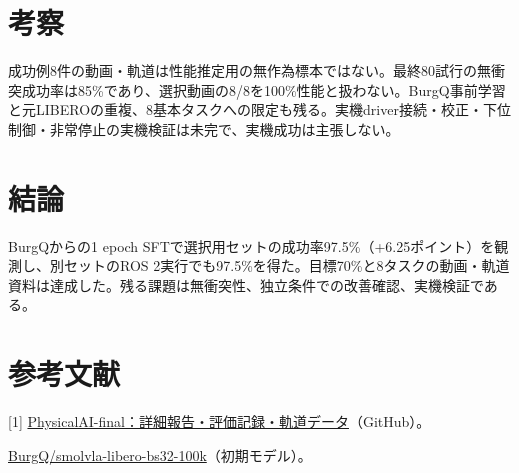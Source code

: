 \documentclass[paper=a4,fontsize=10pt,baselineskip=15pt]{jlreq}
\newcommand{\repo}{https://github.com/lemonydrink/PhysicalAI-final}
\begin{document}
\section{考察}
成功例8件の動画・軌道は性能推定用の無作為標本ではない。最終80試行の無衝突成功率は85\%であり、選択動画の8/8を100\%性能と扱わない。BurgQ事前学習と元LIBEROの重複、8基本タスクへの限定も残る。実機driver接続・校正・下位制御・非常停止の実機検証は未完で、実機成功は主張しない。
\section{結論}
BurgQからの1 epoch SFTで選択用セットの成功率97.5\%（+6.25ポイント）を観測し、別セットのROS 2実行でも97.5\%を得た。目標70\%と8タスクの動画・軌道資料は達成した。残る課題は無衝突性、独立条件での改善確認、実機検証である。
\section{参考文献}
{\small [1] \href{\repo/tree/main/reports/experiment-burgq/final-report}{PhysicalAI-final：詳細報告・評価記録・軌道データ}（GitHub）。\par
[2] \href{https://huggingface.co/BurgQ/smolvla-libero-bs32-100k}{BurgQ/smolvla-libero-bs32-100k}（初期モデル）。}
\end{document}
